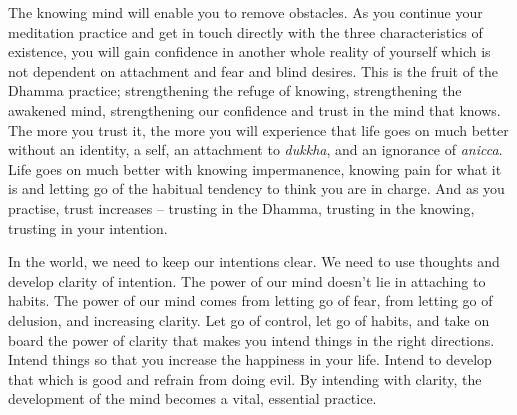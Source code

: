 The knowing mind will enable you to remove obstacles. As you continue your meditation practice and get in touch directly with the three characteristics of existence, you will gain confidence in another whole reality of yourself which is not dependent on attachment and fear and blind desires. This is the fruit of the Dhamma practice; strengthening the refuge of knowing, strengthening the awakened mind, strengthening our confidence and trust in the mind that knows. The more you trust it, the more you will experience that life goes on much better without an identity, a self, an attachment to \textit{dukkha}, and an ignorance of \textit{anicca}. Life goes on much better with knowing impermanence, knowing pain for what it is and letting go of the habitual tendency to think you are in charge.  And as you practise, trust increases -- trusting in the Dhamma, trusting in the knowing, trusting in your intention.

In the world, we need to keep our intentions clear. We need to use thoughts and develop clarity of intention. The power of our mind doesn't lie in attaching to habits. The power of our mind comes from letting go of fear, from letting go of delusion, and increasing clarity. Let go of control, let go of habits, and take on board the power of clarity that makes you intend things in the right directions. Intend things so that you increase the happiness in your life. Intend to develop that which is good and refrain from doing evil. By intending with clarity, the development of the mind becomes a vital, essential practice.

